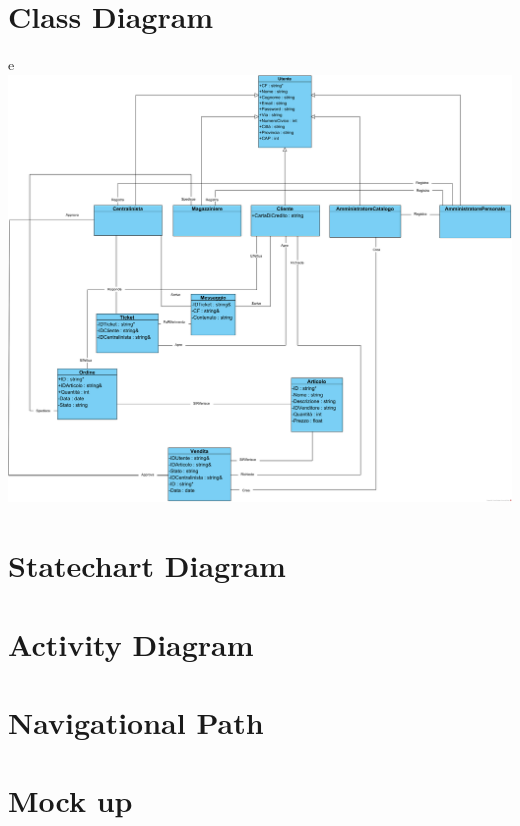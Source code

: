 \documentclass[12pt,a4paper]{article}
\begin{document}
\section{Class Diagram}
e\includegraphics[width=\textwidth]{diagrammadiclasse}

\section{Statechart Diagram}

\section{Activity Diagram}

\section{Navigational Path}

\section{Mock up}
\end{document}
